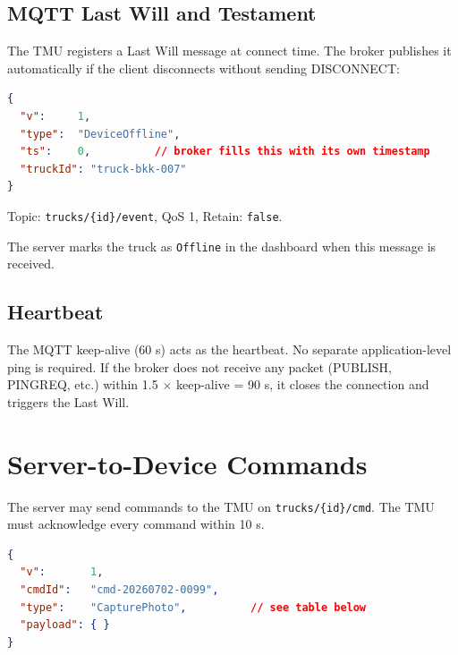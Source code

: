 \documentclass{article}
\begin{document}
\subsection{MQTT Last Will and Testament}

The TMU registers a Last Will message at connect time. The broker publishes it
automatically if the client disconnects without sending DISCONNECT:

\begin{lstlisting}[language=json, caption=Last Will payload]
{
  "v":     1,
  "type":  "DeviceOffline",
  "ts":    0,          // broker fills this with its own timestamp
  "truckId": "truck-bkk-007"
}
\end{lstlisting}

Topic: \texttt{trucks/\{id\}/event}, QoS 1, Retain: \texttt{false}.

The server marks the truck as \texttt{Offline} in the dashboard when this
message is received.

\subsection{Heartbeat}

The MQTT keep-alive (60 s) acts as the heartbeat. No separate application-level
ping is required. If the broker does not receive any packet (PUBLISH, PINGREQ,
etc.) within 1.5 $\times$ keep-alive = 90 s, it closes the connection and
triggers the Last Will.

\section{Server-to-Device Commands}

The server may send commands to the TMU on \texttt{trucks/\{id\}/cmd}.
The TMU must acknowledge every command within 10 s.

\begin{lstlisting}[language=json, caption=Command envelope]
{
  "v":       1,
  "cmdId":   "cmd-20260702-0099",
  "type":    "CapturePhoto",          // see table below
  "payload": { }
}
\end{lstlisting}
\end{document}

